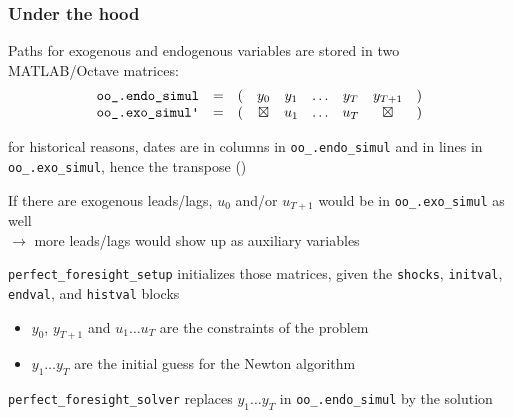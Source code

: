 \documentclass[handout,usepdftitle=false,xcolor=dvipsnames,aspectratio=169]{beamer}
\begin{document}
\begin{frame}
  \frametitle{Under the hood}
  \begin{witemize}
    \item Paths for exogenous and endogenous variables are stored in two
    MATLAB/Octave matrices:
    \begin{equation*}
      \begin{matrix}
        \texttt{oo\_.endo\_simul}                & = & ( & y_0       & y_1 & \ldots & y_T & y_{T+1}   & ) \\
        \texttt{oo\_.exo\_simul\textquotesingle} & = & ( & \boxtimes & u_1 & \ldots & u_T & \boxtimes & )
      \end{matrix}
    \end{equation*}
    \item for historical reasons, dates are in columns in
    \texttt{oo\_.endo\_simul} and in lines in \\
    \texttt{oo\_.exo\_simul},
    hence the transpose (\texttt{\textquotesingle})
    \item If there are exogenous leads/lags, $u_0$ and/or $u_{T+1}$ would be in \texttt{oo\_.exo\_simul\textquotesingle} as well\\
    $\rightarrow$ more leads/lags would show up as auxiliary variables

    \item \texttt{perfect\_foresight\_setup} initializes those
    matrices, given the \texttt{shocks}, \texttt{initval}, \texttt{endval}, and
    \texttt{histval} blocks
    \begin{itemize}
      \item $y_0$, $y_{T+1}$ and $u_1 \ldots u_T$ are the constraints of the
            problem
      \item $y_1\ldots y_T$ are the initial guess for the Newton algorithm
    \end{itemize}
    \item \texttt{perfect\_foresight\_solver} replaces $y_1\ldots y_T$ in
    \texttt{oo\_.endo\_simul} by the solution
  \end{witemize}
\end{frame}
\end{document}
